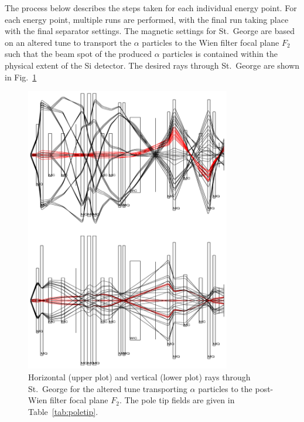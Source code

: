 The process below describes the steps taken for each individual energy
point. For each energy point, multiple runs are performed, with the
final run taking place with the final separator settings. The magnetic
settings for St.\ George are based on an altered tune to transport the
$\alpha$ particles to the Wien filter focal plane $F_2$ such that the
beam spot of the produced $\alpha$ particles is contained within the
physical extent of the Si detector. The desired rays through St.\ George
are shown in Fig.~\ref{fig:raytrace-altered}

\begin{figure}
    \begin{center}
        \centerline{
            \includegraphics[width=0.8\textwidth]{figures/raytrace.png}}
        \caption[Horizontal and vertical rays through St.\
            George for $\alpha$ particles]{Horizontal (upper plot) and
            vertical (lower plot) rays through St.\ George for the
            altered tune transporting $\alpha$ particles to the
            post-Wien filter focal plane $F_2$. The pole tip fields are
            given in Table~\ref{tab:poletip}.}
        \label{fig:raytrace-altered}
    \end{center}
\end{figure}

